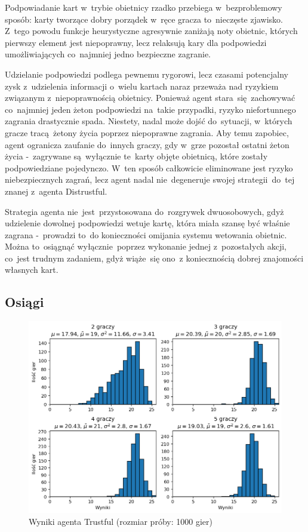 \documentclass[declaration,shortabstract,inz]{iithesis}
\begin{document}
Podpowiadanie kart w~trybie obietnicy rzadko przebiega w~bezproblemowy sposób: karty tworzące dobry porządek w~ręce gracza to~nieczęste zjawisko. Z~tego powodu funkcje heurystyczne agresywnie zaniżają noty obietnic, których pierwszy element jest niepoprawny, lecz relaksują kary dla podpowiedzi umożliwiających co~najmniej jedno bezpieczne zagranie.

Udzielanie podpowiedzi podlega pewnemu rygorowi, lecz czasami potencjalny zysk z~udzielenia informacji o~wielu kartach naraz przeważa nad ryzykiem związanym z~niepoprawnością obietnicy. Ponieważ agent stara~się zachowywać co~najmniej jeden żeton podpowiedzi na~takie przypadki, ryzyko niefortunnego zagrania drastycznie spada. Niestety, nadal może dojść do~sytuacji, w~których gracze tracą żetony życia poprzez niepoprawne zagrania. Aby temu zapobiec, agent ogranicza zaufanie do~innych graczy, gdy w~grze pozostał ostatni żeton życia -~zagrywane są~wyłącznie te~karty objęte obietnicą, które zostały podpowiedziane pojedynczo. W~ten sposób całkowicie eliminowane jest ryzyko niebezpiecznych zagrań, lecz agent nadal nie~degeneruje swojej strategii do~tej znanej z~agenta Distrustful.

Strategia agenta nie~jest~przystosowana do~rozgrywek dwuosobowych, gdyż udzielenie dowolnej podpowiedzi wetuje kartę, która miała szansę być właśnie zagrana -~prowadzi to~do konieczności omijania systemu wetowania obietnic. Można to~osiągnąć wyłącznie poprzez wykonanie jednej z~pozostałych akcji, co~jest trudnym zadaniem, gdyż wiąże~się ono~z koniecznością dobrej znajomości własnych kart.

\subsection*{Osiągi}

\begin{figure}[H]
	\centering
	\captionsetup{format=hang}
	\includegraphics[width=\textwidth,height=\textheight,keepaspectratio]{Trustful.png}
	\caption[Caption]{Wyniki agenta Trustful (rozmiar próby: 1000 gier)}
	\label{fig:Trustful}
\end{figure}
\end{document}
